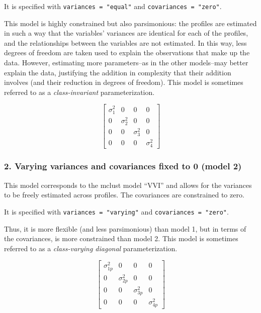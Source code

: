 \documentclass[
  english,
  man]{apa6}
\begin{document}
It is specified with \texttt{variances\ =\ "equal"} and \texttt{covariances\ =\ "zero"}.

This model is highly constrained but also parsimonious: the profiles are estimated in such a way that the variables' variances are identical for each of the profiles, and the relationships between the variables are not estimated. In this way, less degrees of freedom are taken used to explain the observations that make up the data. However, estimating more parameters--as in the other models--may better explain the data, justifying the addition in complexity that their addition involves (and their reduction in degrees of freedom). This model is sometimes referred to as a \emph{class-invariant} parameterization.

\[
\left[ \begin{matrix} { \sigma  }_{ 1 }^{ 2 } & 0 & 0 & 0 \\ 0 & { \sigma  }_{ 2 }^{ 2 } & 0 & 0 \\ 0 & 0 & { \sigma  }_{ 3 }^{ 2 } & 0 \\ 0 & 0 & 0 & { \sigma  }_{ 4 }^{ 2 } \end{matrix} \right] 
\]

\hypertarget{varying-variances-and-covariances-fixed-to-0-model-2}{%
\subsubsection{2. Varying variances and covariances fixed to 0 (model 2)}\label{varying-variances-and-covariances-fixed-to-0-model-2}}

This model corresponds to the mclust model \enquote{VVI} and allows for the variances to be freely estimated across profiles. The covariances are constrained to zero.

It is specified with \texttt{variances\ =\ "varying"} and \texttt{covariances\ =\ "zero"}.

Thus, it is more flexible (and less parsimonious) than model 1, but in terms of the covariances, is more constrained than model 2. This model is sometimes referred to as a \emph{class-varying diagonal} parameterization.

\[ 
\left[ \begin{matrix} { \sigma  }_{ 1p }^{ 2 } & 0 & 0 & 0 \\ 0 & { \sigma  }_{ 2p }^{ 2 } & 0 & 0 \\ 0 & 0 & { \sigma  }_{ 3p }^{ 2 } & 0 \\ 0 & 0 & 0 & { \sigma  }_{ 4p }^{ 2 } \end{matrix} \right] 
\]
\end{document}
